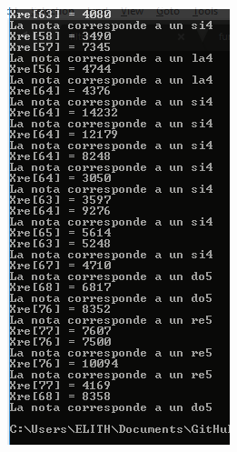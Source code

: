 \begin{figure}[H]
	\begin{center}
		\includegraphics[scale=1]{img/salida2.png}
		\label{fig:wav1}
	\end{center}
\end{figure}